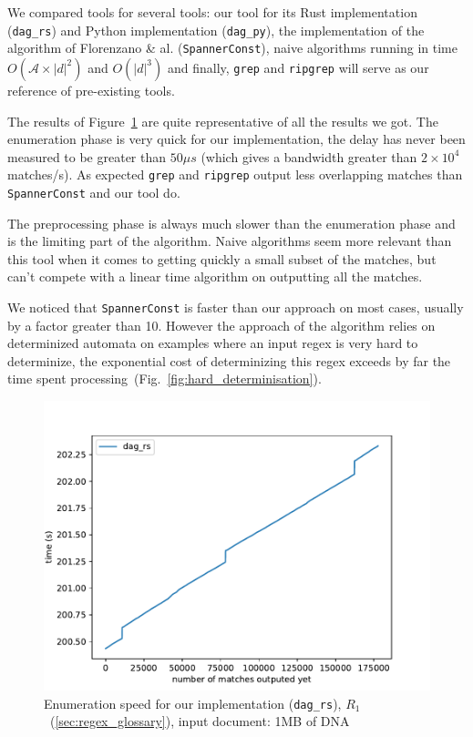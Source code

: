 \documentclass[12px]{article}
\theoremstyle{definition}
\begin{document}
      We compared tools for several tools: our tool for its Rust implementation
      (\texttt{dag\_rs}) and Python implementation (\texttt{dag\_py}), the
      implementation of the algorithm of Florenzano \& al.
      \cite{florenzano2018constant} (\texttt{SpannerConst}), naive algorithms
      running in time $O(\mathcal{A} \times |d|^2)$ and $O(|d|^3)$ and finally,
      \texttt{grep} and \texttt{ripgrep} will serve as our reference of
      pre-existing tools.

      The results of Figure~\ref{fig:bench} are quite representative of all the
      results we got. The enumeration phase is very quick for our
      implementation, the delay has never been measured to be greater than $50
      \mu s$ (which gives a bandwidth greater than $2 \times 10^4$ matches/s).
      As expected \texttt{grep} and \texttt{ripgrep} output less overlapping
      matches than \texttt{SpannerConst} and our tool do.

      The preprocessing phase is always much slower than the enumeration phase
      and is the limiting part of the algorithm. Naive algorithms seem more
      relevant than this tool when it comes to getting quickly a small subset
      of the matches, but can't compete with a linear time algorithm on
      outputting all the matches.

      We noticed that \texttt{SpannerConst} is faster than our approach on most
      cases, usually by a factor greater than 10. However the approach of the
      algorithm relies on determinized automata on examples where an input
      regex is very hard to determinize, the exponential cost of determinizing
      this regex exceeds by far the time spent
      processing~(Fig.~\ref{fig:hard_determinisation}).


      \begin{figure}%
        \label{fig:bench}
        \caption{
          Enumeration speed for our implementation (\texttt{dag\_rs}),
          $R_1$~(\ref{sec:regex_glossary}), input document: 1MB of DNA }
        \center\includegraphics[width=5in]{figures/bench_enum_only}
      \end{figure}
\end{document}

